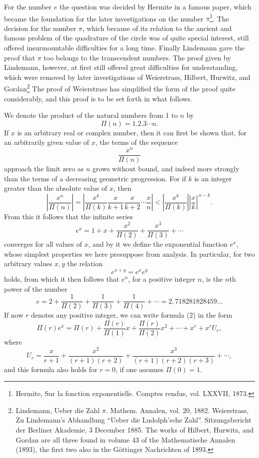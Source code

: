 \documentclass[11pt]{article}
\begin{document}
For the number $e$ the question was decided by Hermite in a famous paper, which became the foundation for the later investigations on the number $\pi$\footnote{Hermite, Sur la fonction exponentielle. Comptes rendus, vol. LXXVII, 1873.}. The decision for the number $\pi$, which because of its relation to the ancient and famous problem of the quadrature of the circle was of quite special interest, still offered insurmountable difficulties for a long time. Finally Lindemann gave the proof that $\pi$ too belongs to the transcendent numbers. The proof given by Lindemann, however, at first still offered great difficulties for understanding, which were removed by later investigations of Weierstrass, Hilbert, Hurwitz, and Gordan\footnote{Lindemann, Ueber die Zahl $\pi$. Mathem. Annalen, vol. 20, 1882. Weierstrass, Zu Lindemann's Abhandlung ``Ueber die Ludolph'sche Zahl''. Sitzungsbericht der Berliner Akademie, 3 December 1885. The works of Hilbert, Hurwitz, and Gordan are all three found in volume 43 of the Mathematische Annalen (1893), the first two also in the Göttinger Nachrichten of 1893.}
The proof of Weierstrass has simplified the form of the proof quite considerably, and this proof is to be set forth in what follows.

We denote the product of the natural numbers from 1 to $n$ by
\[
\Pi(n)=1.2.3\cdots n.
\]
If $x$ is an arbitrary real or complex number, then it can first be shown that, for an arbitrarily given value of $x$, the terms of the sequence
\begin{equation}\tag{1}
\frac{x^n}{\Pi(n)}
\end{equation}
approach the limit zero as $n$ grows without bound, and indeed more strongly than the terms of a decreasing geometric progression. For if $k$ is an integer greater than the absolute value of $x$, then
\[
\left|\frac{x^n}{\Pi(n)}\right|
=
\left|\frac{x^k}{\Pi(k)}\frac{x}{k+1}\frac{x}{k+2}\cdots\frac{x}{n}\right|
<
\left|\frac{x^k}{\Pi(k)}\right|\left|\frac{x}{k}\right|^{\,n-k}.
\]
From this it follows that the infinite series
\begin{equation}\tag{2}
e^x=1+x+\frac{x^2}{\Pi(2)}+\frac{x^3}{\Pi(3)}+\cdots
\end{equation}
converges for all values of $x$, and by it we define the exponential function $e^x$, whose simplest properties we here presuppose from analysis. In particular, for two arbitrary values $x,y$ the relation
\[
e^{x+y}=e^x e^y
\]
holds, from which it then follows that $e^n$, for a positive integer $n$, is the $n$th power of the number
\begin{equation}\tag{3}
e=2+\frac1{\Pi(2)}+\frac1{\Pi(3)}+\frac1{\Pi(4)}+\cdots
=2{,}718281828459\ldots
\end{equation}
If now $r$ denotes any positive integer, we can write formula (2) in the form
\begin{equation}\tag{4}
\Pi(r)e^x=\Pi(r)+\frac{\Pi(r)}{\Pi(1)}x+\frac{\Pi(r)}{\Pi(2)}x^2+\cdots+x^r+x^rU_r,
\end{equation}
where
\begin{equation}\tag{5}
U_r=\frac{x}{r+1}+\frac{x^2}{(r+1)(r+2)}+\frac{x^3}{(r+1)(r+2)(r+3)}+\cdots,
\end{equation}
and this formula also holds for $r=0$, if one assumes $\Pi(0)=1$.
\end{document}
